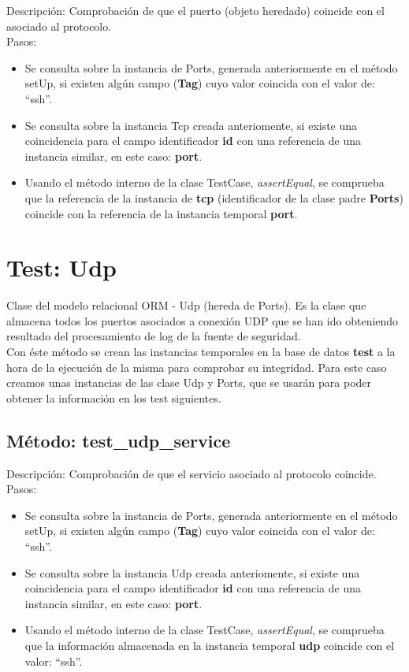 Descripción: Comprobación de que el puerto (objeto heredado) coincide con el asociado al protocolo.\\
Pasos:
\begin{itemize}
\item Se consulta sobre la instancia de Ports, generada anteriormente en el método setUp, si existen algún campo (\textbf{Tag}) cuyo valor coincida con el valor de: ``ssh''.
\item Se consulta sobre la instancia Tcp creada anteriomente, si existe una coincidencia para el campo identificador \textbf{id} con una referencia de una instancia similar, en este caso: \textbf{port}.
\item Usando el método interno de la clase TestCase, \emph{assertEqual}, se comprueba que la referencia de la instancia de \textbf{tcp} (identificador de la clase padre \textbf{Ports}) coincide con la referencia de la instancia temporal \textbf{port}.
\end{itemize}



\section{\quad Test: Udp}

Clase del modelo relacional ORM - Udp (hereda de Ports). Es la clase que almacena todos los puertos asociados a conexión UDP que se han ido obteniendo resultado del procesamiento de log de la fuente de seguridad.\\

Con éste método se crean las instancias temporales en la base de datos \textbf{test} a la hora de la ejecución de la misma para comprobar su integridad. Para este caso creamos unas instancias de las clase Udp y Ports, que se usarán para poder obtener la información en los test siguientes.\\




\subsection{\quad Método: test\_udp\_service}

Descripción: Comprobación de que el servicio asociado al protocolo coincide.\\
Pasos:
\begin{itemize}
\item Se consulta sobre la instancia de Ports, generada anteriormente en el método setUp, si existen algún campo (\textbf{Tag}) cuyo valor coincida con el valor de: ``ssh''.
\item Se consulta sobre la instancia Udp creada anteriomente, si existe una coincidencia para el campo identificador \textbf{id} con una referencia de una instancia similar, en este caso: \textbf{port}.
\item Usando el método interno de la clase TestCase, \emph{assertEqual}, se comprueba que la información almacenada en la instancia temporal \textbf{udp} coincide con el valor: ``ssh''.
\end{itemize}

